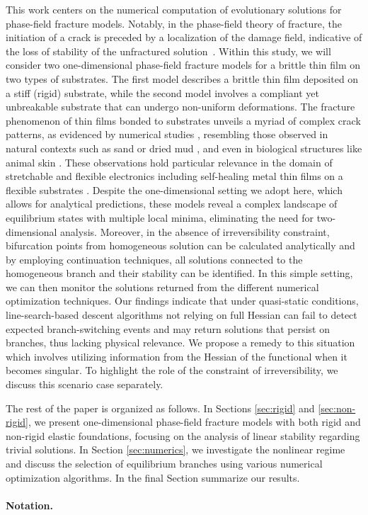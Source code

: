 This work centers on the numerical computation of evolutionary solutions for phase-field fracture models. Notably, in the phase-field theory of fracture, the initiation of a crack is preceded by a localization of the damage field, indicative of the loss of stability of the unfractured solution~\cite{Baldelli2014-ho,Kuhn2015-rt,Baldelli2021-gc,Harandi2023-cd}. Within this study, we will consider two one-dimensional phase-field fracture models for a brittle thin film on two types of substrates. The first model describes a brittle thin film deposited on a stiff (rigid) substrate, while the second model involves a compliant yet unbreakable substrate that can undergo non-uniform deformations. The fracture phenomenon of thin films bonded to substrates unveils a myriad of complex crack patterns, as evidenced by numerical studies \cite{Baldelli2014-ho,Alessi2019-bx,Hu2020-nt,Salman2021-mn,Baldelli2021-gc}, resembling those observed in natural contexts such as sand or dried mud \cite{Goehring2010-xz}, and even in biological structures like animal skin \cite{Qin2014-wz}. These observations hold particular relevance in the domain of stretchable and flexible electronics \cite{Faurie2019-to,Godard2022-ss} including  self-healing metal thin films on a flexible substrates \cite{Trost2024-ca}.  Despite the one-dimensional setting we adopt here, which allows for analytical predictions, these models reveal a complex landscape of equilibrium states with multiple local minima, eliminating the need for two-dimensional analysis. Moreover, in the absence of irreversibility constraint, bifurcation points from homogeneous solution can be calculated analytically and by employing continuation techniques, all solutions connected to the homogeneous branch and their stability can be identified. 
In this simple setting, we can then monitor the solutions returned from  the different  numerical optimization techniques. Our findings indicate that under quasi-static conditions, line-search-based descent algorithms not relying on full Hessian can fail to detect expected branch-switching events and may return solutions that persist on  branches, thus lacking physical relevance. 
We propose a remedy to this situation which involves utilizing information from the Hessian of the functional when it becomes singular. To highlight the role of the constraint of irreversibility, we discuss this scenario case separately.

The rest of the paper is organized as follows. In Sections \ref{sec:rigid} and \ref{sec:non-rigid}, we present one-dimensional phase-field fracture models with both rigid and non-rigid elastic foundations, focusing on the analysis  of linear stability regarding trivial solutions. In Section \ref{sec:numerics}, we investigate the nonlinear regime and discuss the selection of equilibrium branches using various numerical optimization algorithms. In the final Section  summarize our results.

\paragraph{Notation.} 